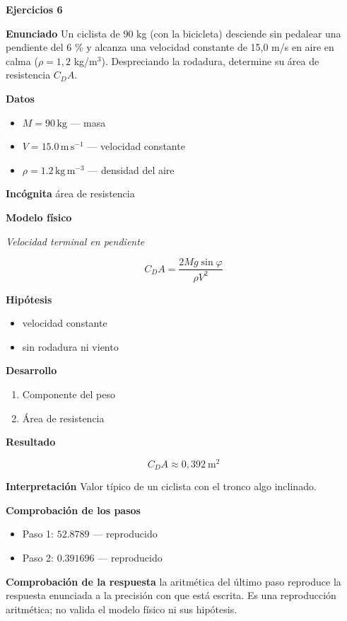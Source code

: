 \documentclass[10pt,openany]{book}
\begin{document}
\noindent\textbf{Ejercicios 6}

\noindent\textbf{Enunciado}
Un ciclista de 90 kg (con la bicicleta) desciende sin pedalear una pendiente del 6 \% y alcanza una velocidad constante de 15,0 m/s en aire en calma (\(\rho = 1{,}2\) kg/m\(^3\)). Despreciando la rodadura, determine su área de resistencia \(C_D A\).

\noindent\textbf{Datos}
\begin{itemize}
\item $M = 90\,\mathrm{kg}$ — masa
\item $V = 15.0\,\mathrm{m}\,\mathrm{s}^{-1}$ — velocidad constante
\item $\rho = 1.2\,\mathrm{kg}\,\mathrm{m}^{-3}$ — densidad del aire
\end{itemize}

\noindent\textbf{Incógnita}
área de resistencia

\noindent\textbf{Modelo físico}

\noindent\textit{Velocidad terminal en pendiente}

\[
C_D A = \frac{2Mg\sin\varphi}{\rho V^{2}}
\]

\noindent\textbf{Hipótesis}
\begin{itemize}
\item velocidad constante
\item sin rodadura ni viento
\end{itemize}

\noindent\textbf{Desarrollo}
\begin{enumerate}
\item
Componente del peso
\item
Área de resistencia
\end{enumerate}

\noindent\textbf{Resultado}

\[
C_D A \approx 0{,}392\ \mathrm{m^{2}}
\]

\noindent\textbf{Interpretación}
Valor típico de un ciclista con el tronco algo inclinado.

\noindent\textbf{Comprobación de los pasos}
\begin{itemize}
\item Paso 1: $52.8789$ — reproducido
\item Paso 2: $0.391696$ — reproducido
\end{itemize}

\noindent\textbf{Comprobación de la respuesta} la aritmética del último paso reproduce la respuesta enunciada a la precisión con que está escrita. Es una reproducción aritmética; no valida el modelo físico ni sus hipótesis.
\end{document}
